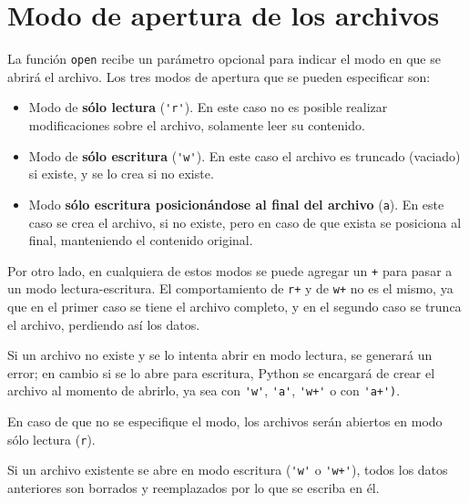 \section{Modo de apertura de los archivos}

La función \lstinline!open! recibe un parámetro opcional para indicar el
modo en que se abrirá el archivo.  Los tres modos de apertura que se pueden
especificar son:

\begin{itemize}
\item Modo de \textbf{sólo lectura} (\lstinline!'r'!).   En este caso no es
posible realizar modificaciones sobre el archivo, solamente leer su
contenido.

\item Modo de \textbf{sólo escritura} (\lstinline!'w'!). En este caso el
archivo es truncado (vaciado) si existe, y se lo crea si no existe.

\item Modo \textbf{sólo escritura posicionándose al final del archivo}
(\lstinline!a!). En este caso se crea el archivo, si no existe, pero en
caso de que exista se posiciona al final, manteniendo el contenido
original.

\end{itemize}

Por otro lado, en cualquiera de estos modos se puede agregar un
\lstinline!+! para pasar a un modo lectura-escritura. El comportamiento de
\lstinline!r+! y de \lstinline!w+! no es el mismo, ya que en el primer caso
se tiene el archivo completo, y en el segundo caso se trunca el archivo,
perdiendo así los datos.

\begin{observacion}
Si un archivo no existe y se lo intenta abrir en modo lectura, se generará
un error; en cambio si se lo abre para escritura, Python se encargará de
crear el archivo al momento de abrirlo, ya sea con \lstinline!'w'!,
\lstinline!'a'!, \lstinline!'w+'! o con \lstinline!'a+')!.
\end{observacion}

En caso de que no se especifique el modo, los archivos serán abiertos en
modo sólo lectura (\lstinline!r!).

\begin{atencion}
Si un archivo existente se abre en modo escritura (\lstinline!'w'! o
\lstinline!'w+'!), todos los datos anteriores son borrados y reemplazados
por lo que se escriba en él.
\end{atencion}

